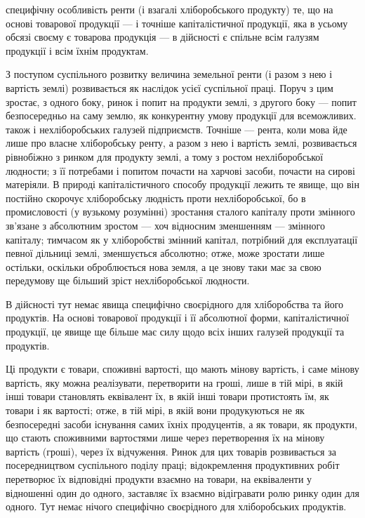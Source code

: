 \parcont{}  %
специфічну особливість ренти (і взагалі хліборобського продукту) те, що на основі
товарової продукції — і точніше капіталістичної продукції, яка в усьому обсязі
своєму є товарова продукція — в дійсності є спільне всім галузям продукції
і всім їхнім продуктам.

З поступом суспільного розвитку величина земельної ренти (і разом з нею
і вартість землі) розвивається як наслідок усієї суспільної праці. Поруч з цим
зростає, з одного боку, ринок і попит на продукти землі, з другого боку — попит
безпосередньо на саму землю, як конкурентну умову продукції для всеможливих.
також і нехліборобських галузей підприємств. Точніше — рента, коли мова
йде лише про власне хліборобську ренту, а разом з нею і вартість землі, розвивається
рівнобіжно з ринком для продукту землі, а тому з ростом нехліборобської
людности; з її потребами і попитом почасти на харчові засоби, почасти
на сирові матеріяли. В природі капіталістичного способу продукції лежить те
явище, що він постійно скорочує хліборобську людність проти нехліборобської,
бо в промисловості (у вузькому розумінні) зростання сталого капіталу проти
змінного зв’язане з абсолютним зростом — хоч відносним зменшенням — змінного
капіталу; тимчасом як у хліборобстві змінний капітал, потрібний для експлуатації
певної дільниці землі, зменшується абсолютно; отже, може зростати лише остільки,
оскільки оброблюється нова земля, а це знову таки має за свою передумову ще
більший зріст нехліборобської людности.

В дійсності тут немає явища специфічно своєрідного для хліборобства та
його продуктів. На основі товарової продукції і її абсолютної форми, капіталістичної
продукції, це явище ще більше має силу щодо всіх інших галузей продукції
та продуктів.

Ці продукти є товари, споживні вартості, що мають мінову вартість, і саме
мінову вартість, яку можна реалізувати, перетворити на гроші, лише в тій мірі,
в якій інші товари становлять еквівалент їх, в якій інші товари протистоять їм, як
товари і як вартості; отже, в тій мірі, в якій вони продукуються не як безпосередні
засоби існування самих їхніх продуцентів, а як товари, як продукти,
що стають споживними вартостями лише через перетворення їх на мінову
вартість (гроші), через їх відчуження. Ринок для цих товарів розвивається
за посередництвом суспільного поділу праці; відокремлення продуктивних робіт
перетворює їх відповідні продукти взаємно на товари, на еквіваленти у відношенні
один до одного, заставляє їх взаємно відігравати ролю ринку один для
одного. Тут немає нічого специфічно своєрідного для хліборобських продуктів.

